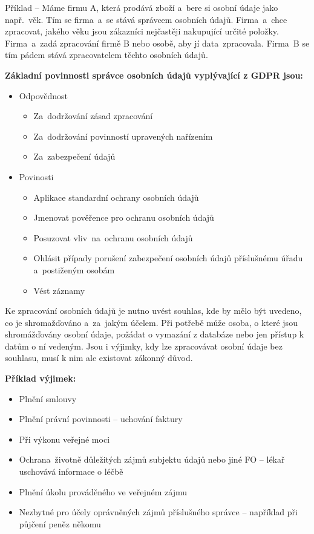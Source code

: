 Příklad -- Máme firmu A, která prodává zboží a~bere si osobní údaje jako např.\ věk. Tím se firma~a~se stává správcem osobních údajů. Firma~a~chce zpracovat, jakého věku jsou zákazníci nejčastěji nakupující určité položky. Firma~a~zadá zpracování firmě B nebo osobě, aby jí data~zpracovala. Firma~B se tím pádem stává zpracovatelem těchto osobních údajů.
\newline

\noindent\textbf{Základní povinnosti správce osobních údajů vyplývající z GDPR jsou:}
\begin{itemize}[noitemsep]
    \item Odpovědnost
    \begin{itemize}[noitemsep]
        \item Za~dodržování zásad zpracování
        \item Za~dodržování povinností upravených nařízením
        \item Za~zabezpečení údajů
    \end{itemize}
    \item Povinosti
    \begin{itemize}[noitemsep]
        \item Aplikace standardní ochrany osobních údajů
        \item Jmenovat pověřence pro ochranu osobních údajů
        \item Posuzovat vliv~na~ochranu osobních údajů
        \item Ohlásit případy porušení zabezpečení osobních údajů příslušnému úřadu a~postiženým osobám
        \item Vést záznamy
    \end{itemize}
\end{itemize}

Ke zpracování osobních údajů je nutno uvést souhlas, kde by mělo být uvedeno, co je shromažďováno a~za~jakým účelem. Při potřebě může osoba, o které jsou shromážďovány osobní údaje, požádat o vymazání z databáze nebo jen přístup k datům o ní vedeným. Jsou i výjimky, kdy lze zpracovávat osobní údaje bez souhlasu, musí k nim ale existovat zákonný důvod.

\newpage 
\noindent\textbf{Příklad výjimek:}
\begin{itemize}[noitemsep]
    \item Plnění smlouvy
    \item Plnění právní povinnosti -- uchování faktury
    \item Při výkonu veřejné moci
    \item Ochrana~životně důležitých zájmů subjektu údajů nebo jiné FO -- lékař uschovává informace o léčbě
    \item Plnění úkolu prováděného ve veřejném zájmu
    \item Nezbytné pro účely oprávněných zájmů příslušného správce -- například při půjčení peněz někomu 
\end{itemize}


